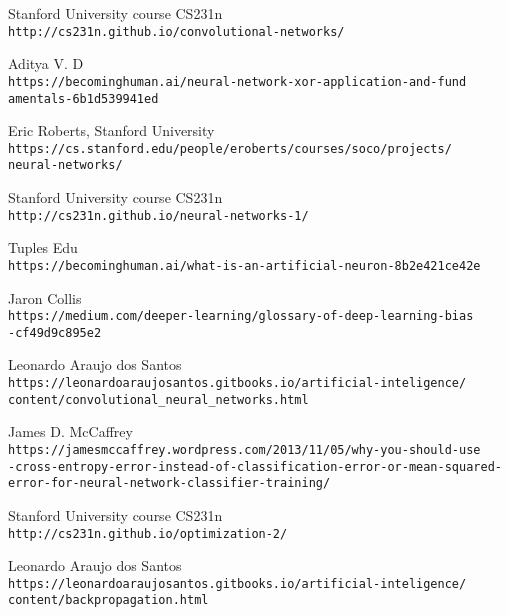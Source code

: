 \begin{thebibliography}{99}

Stanford University course CS231n
\\\texttt{http://cs231n.github.io/convolutional-networks/}

Aditya V. D
\\\texttt{https://becominghuman.ai/neural-network-xor-application-and-fund\\amentals-6b1d539941ed}

Eric Roberts, Stanford University
\\\texttt{https://cs.stanford.edu/people/eroberts/courses/soco/projects/\\neural-networks/}

Stanford University course CS231n
\\\texttt{http://cs231n.github.io/neural-networks-1/}

Tuples Edu
\\\texttt{https://becominghuman.ai/what-is-an-artificial-neuron-8b2e421ce42e}

Jaron Collis
\\\texttt{https://medium.com/deeper-learning/glossary-of-deep-learning-bias\\-cf49d9c895e2}

Leonardo Araujo dos Santos
\\\texttt{https://leonardoaraujosantos.gitbooks.io/artificial-inteligence/\\content/convolutional\_neural\_networks.html}

James D. McCaffrey
\\\texttt{https://jamesmccaffrey.wordpress.com/2013/11/05/why-you-should-use\\-cross-entropy-error-instead-of-classification-error-or-mean-squared-\\error-for-neural-network-classifier-training/}

Stanford University course CS231n
\\\texttt{http://cs231n.github.io/optimization-2/}

Leonardo Araujo dos Santos
\\\texttt{https://leonardoaraujosantos.gitbooks.io/artificial-inteligence/\\content/backpropagation.html}


\end{thebibliography}

